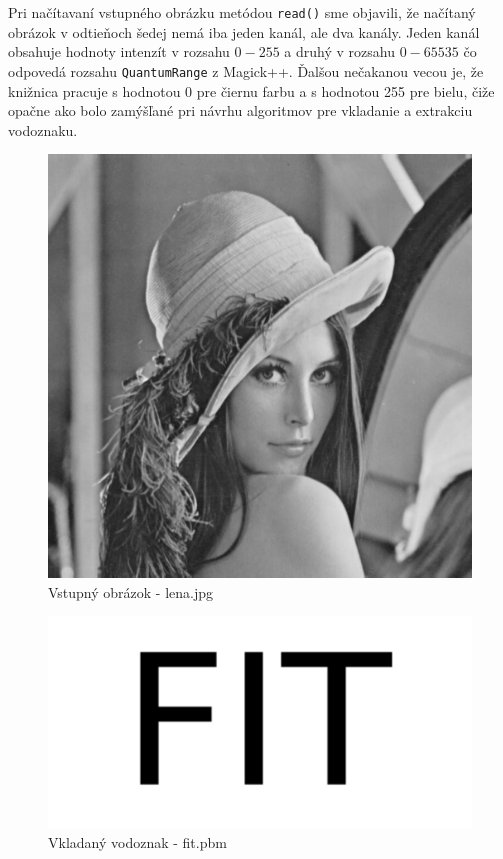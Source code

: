 Pri načítavaní vstupného obrázku metódou {\tt read()} sme objavili, že načítaný obrázok v odtieňoch šedej nemá iba jeden kanál, ale dva kanály. Jeden kanál obsahuje hodnoty intenzít v rozsahu $0 - 255$ a druhý v rozsahu $0-65535$ čo odpovedá rozsahu {\tt QuantumRange} z Magick++. Ďalšou nečakanou vecou je, že knižnica pracuje s hodnotou 0 pre čiernu farbu a s hodnotou 255 pre bielu, čiže opačne ako bolo zamýšľané pri návrhu algoritmov pre vkladanie a extrakciu vodoznaku.

\begin{figure}
    \centering
    \includegraphics[scale=0.5]{obrazky/lena}
    \caption{Vstupný obrázok - lena.jpg}
    \label{fig:lena}
\end{figure}

\begin{figure}
    \centering
    \includegraphics[scale=0.5]{obrazky/fit}
    \caption{Vkladaný vodoznak - fit.pbm}
    \label{fig:watermark}
\end{figure}

